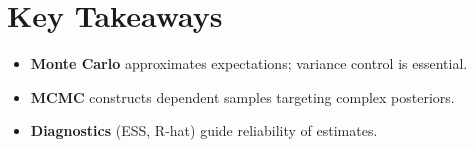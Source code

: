 
\section*{Key Takeaways}

\begin{keytakeaways}
\begin{itemize}[leftmargin=2em]
    \item \textbf{Monte Carlo} approximates expectations; variance control is essential.
    \item \textbf{MCMC} constructs dependent samples targeting complex posteriors.
    \item \textbf{Diagnostics} (ESS, R-hat) guide reliability of estimates.
\end{itemize}
\end{keytakeaways}


